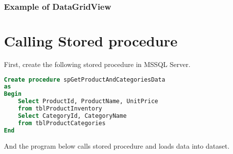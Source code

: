 \subsubsection*{Example of DataGridView}


\section{Calling Stored procedure}

First, create the following stored procedure in MSSQL Server.
\begin{lstlisting}[caption= {Stored procedure}, language=sql]
Create procedure spGetProductAndCategoriesData
as
Begin
	Select ProductId, ProductName, UnitPrice
	from tblProductInventory
	Select CategoryId, CategoryName
	from tblProductCategories
End
\end{lstlisting}

And the program below calls stored procedure and loads data into dataset.


\newpage\thispagestyle{empty}